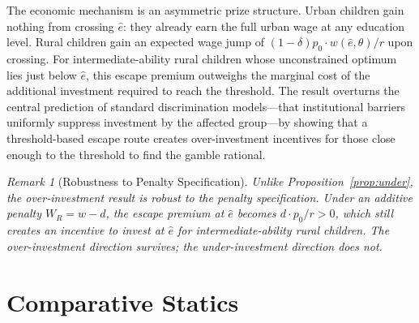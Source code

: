 \documentclass[12pt]{article}
\theoremstyle{plain}
\theoremstyle{definition}
\theoremstyle{remark}
\newtheorem{remark}{Remark}
\begin{document}
The economic mechanism is an asymmetric prize structure.  Urban children gain
nothing from crossing $\hat{e}$: they already earn the full urban wage at any
education level.  Rural children gain an expected wage jump of
$(1-\delta)p_{0}\cdot w(\hat{e},\theta)/r$ upon crossing.  For intermediate-ability
rural children whose unconstrained optimum lies just below $\hat{e}$, this escape
premium outweighs the marginal cost of the additional investment required to reach
the threshold.  The result overturns the central prediction of standard
discrimination models---that institutional barriers uniformly suppress investment
by the affected group---by showing that a threshold-based escape route creates
over-investment incentives for those close enough to the threshold to find the
gamble rational.

\begin{remark}[Robustness to Penalty Specification]
\textit{Unlike Proposition~\ref{prop:under}, the over-investment result is robust
to the penalty specification.  Under an additive penalty $W_{R}=w-d$, the escape
premium at $\hat{e}$ becomes $d\cdot p_{0}/r>0$, which still creates an incentive
to invest at $\hat{e}$ for intermediate-ability rural children.  The
over-investment direction survives; the under-investment direction does not.}
\end{remark}

\section{Comparative Statics}
\end{document}
